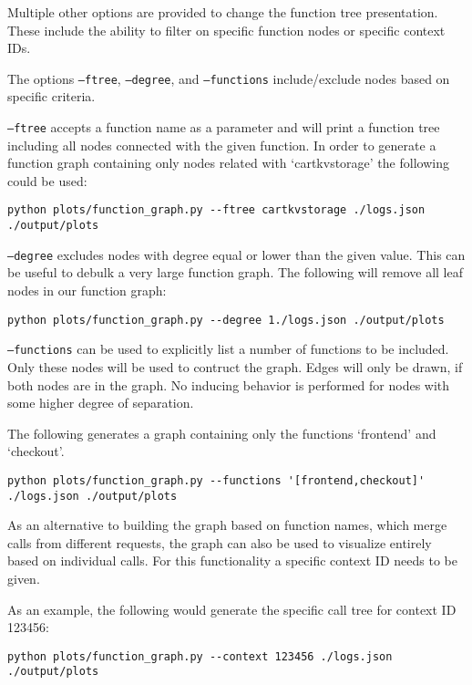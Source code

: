 \documentclass[../main.tex]{subfiles}
\begin{document}
Multiple other options are provided to change the function tree presentation. 
These include the ability to filter on specific function nodes or specific context IDs.

The options \texttt{--ftree}, \texttt{--degree}, and \texttt{--functions} 
include/exclude nodes based on specific criteria.

\texttt{--ftree} accepts a function name as a parameter and will print a function tree including all nodes connected with the given function.
In order to generate a function graph containing only nodes related with `cartkvstorage' the following could be used:
\begin{tcolorbox}
\begin{verbatim}
python plots/function_graph.py --ftree cartkvstorage ./logs.json 
./output/plots
\end{verbatim}
\end{tcolorbox}

\texttt{--degree} excludes nodes with degree equal or lower than the given value. 
This can be useful to debulk a very large function graph.
The following will remove all leaf nodes in our function graph:
\begin{tcolorbox}
\begin{verbatim}
python plots/function_graph.py --degree 1./logs.json ./output/plots
\end{verbatim}
\end{tcolorbox}



\texttt{--functions} can be used to explicitly list a number of functions to be included. 
Only these nodes will be used to contruct the graph. Edges will only be drawn, 
if both nodes are in the graph. 
No inducing behavior is performed for nodes with some higher degree of separation.

The following generates a graph containing only the functions `frontend' and `checkout'.
\begin{tcolorbox}
\begin{verbatim}
python plots/function_graph.py --functions '[frontend,checkout]' 
./logs.json ./output/plots
\end{verbatim}
\end{tcolorbox}

As an alternative to building the graph based on function names, 
which merge calls from different requests, 
the graph can also be used to visualize entirely based on individual calls. 
For this functionality a specific context ID needs to be given.

As an example, the following would generate the specific call tree for context ID 123456:
\begin{tcolorbox}
\begin{verbatim}
python plots/function_graph.py --context 123456 ./logs.json 
./output/plots
\end{verbatim}
\end{tcolorbox}
\end{document}

